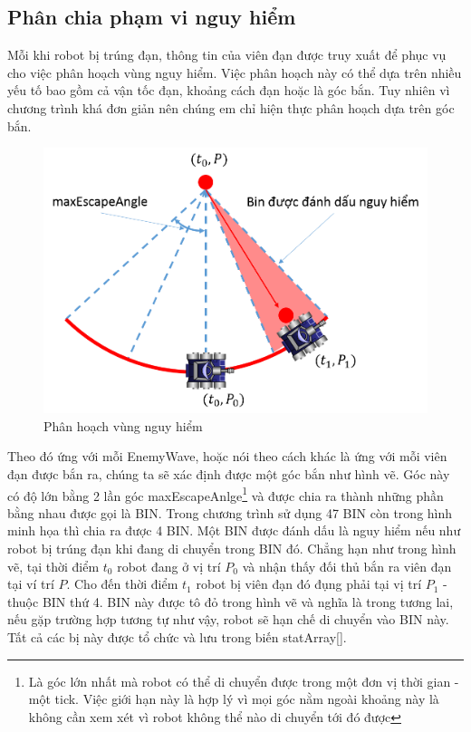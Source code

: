 \documentclass[14pt]{article}
\begin{document}
\subsection{Phân chia phạm vi nguy hiểm}
Mỗi khi robot bị trúng đạn, thông tin của viên đạn được truy xuất để phục vụ cho việc phân hoạch vùng nguy hiểm. Việc phân hoạch này có thể dựa trên nhiều yếu tố bao gồm cả vận tốc đạn, khoảng cách đạn hoặc là góc bắn. Tuy nhiên vì chương trình khá đơn giản nên chúng em chỉ hiện thực phân hoạch dựa trên góc bắn. 
\begin{figure}[H]
\centering
\includegraphics[scale=0.5]{images/segmentation.png}
\caption{Phân hoạch vùng nguy hiểm}
\end{figure}
Theo đó ứng với mỗi EnemyWave, hoặc nói theo cách khác là ứng với mỗi viên đạn được bắn ra, chúng ta sẽ xác định được một góc bắn như hình vẽ. Góc này có độ lớn bằng 2 lần góc maxEscapeAnlge\footnote{Là góc lớn nhất mà robot có thể di chuyển được trong một đơn vị thời gian - một tick. Việc giới hạn này là hợp lý vì mọi góc nằm ngoài khoảng này là không cần xem xét vì robot không thể nào di chuyển tới đó được} và được chia ra thành những phần bằng nhau được gọi là BIN. Trong chương trình sử dụng 47 BIN còn trong hình minh họa thì chia ra được 4 BIN. Một BIN được đánh dấu là nguy hiểm nếu như robot bị trúng đạn khi đang di chuyển trong BIN đó. Chẳng hạn như trong hình vẽ, tại thời điểm $t_0$ robot đang ở vị trí $P_0$ và nhận thấy đối thủ bắn ra viên đạn tại ví trí $P$. Cho đến thời điểm $t_1$ robot bị viên đạn đó đụng phải tại vị trí $P_1$ - thuộc BIN thứ 4. BIN này được tô đỏ trong hình vẽ và nghĩa là trong tương lai, nếu gặp trường hợp tương tự như vậy, robot sẽ hạn chế di chuyển vào BIN này. Tất cả các bị này được tổ chức và lưu trong biến statArray[].
\end{document}

